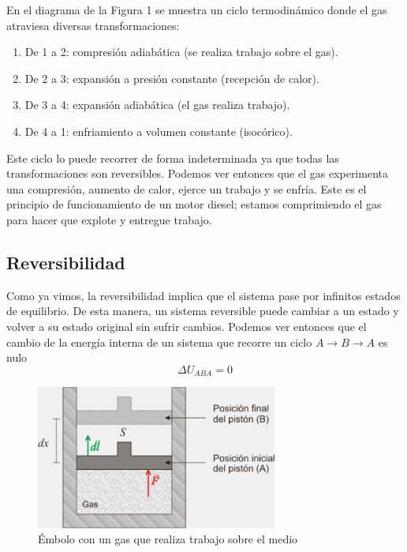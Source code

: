 \documentclass{article}
\begin{document}
En el diagrama de la Figura 1 se muestra un ciclo termodinámico donde el gas
atraviesa diversas transformaciones:
\begin{enumerate}
    \item De 1 a 2: compresión adiabática (se realiza trabajo sobre el gas).
    \item De 2 a 3: expansión a presión constante (recepción de calor).
    \item De 3 a 4: expansión adiabática (el gas realiza trabajo).
    \item De 4 a 1: enfriamiento a volumen constante (isocórico).
\end{enumerate}

Este ciclo lo puede recorrer de forma indeterminada ya que todas las
transformaciones son reversibles. Podemos ver entonces que el gas experimenta
una compresión, aumento de calor, ejerce un trabajo y se enfría. Este es el
principio de funcionamiento de un motor diesel; estamos comprimiendo el gas
para hacer que explote y entregue trabajo.

\subsection{Reversibilidad}
Como ya vimos, la reversibilidad implica que el sistema pase por infinitos
estados de equilibrio. De esta manera, un sistema reversible puede cambiar a un
estado y volver a su estado original sin sufrir cambios. Podemos ver entonces
que el cambio de la energía interna de un sistema que recorre un ciclo $A\to B
    \to A$ es nulo
\begin{equation}
    \Delta U_{ABA} = 0
\end{equation}

\begin{figure}[H]
    \centering
    \includegraphics[width=300px]{embolo-gas.png}
    \caption{Émbolo con un gas que realiza trabajo sobre el medio}
\end{figure}
\end{document}
